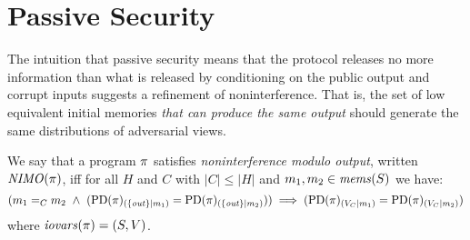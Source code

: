 \section{Passive Security}
\label{section-nimo}
The intuition that passive security means that the protocol releases
no more information than what is released by conditioning on the
public output and corrupt inputs suggests a
refinement of noninterference. That is, the set of low equivalent
initial memories \emph{that can produce the same output} should generate the
same distributions of adversarial views.
\begin{definition}
  \label{definition-NIMO}
  We say that a program  $\pi$ satisfies \emph{noninterference modulo output},
  written $\mathit{NIMO}(\pi)$, iff for all $H$ and $C$ with $|C|\le|H|$ and 
  $m_1,m_2 \in \mathit{mems}(S)$ we have:
  $$
  (\store_1 =_C \store_2 \ \wedge \ 
  (\condd{\progd(\prog)}{\{ \outv \}}{\store_1} = \condd{\progd(\prog)}{\{ \outv \}}{\store_2}))
  \implies 
  (\condd{\progd(\prog)}{V_C}{\store_1} = \condd{\progd(\prog)}{V_C}{\store_2})
  $$
  where $\mathit{iovars}(\pi) = (S,V)$.
\end{definition}

